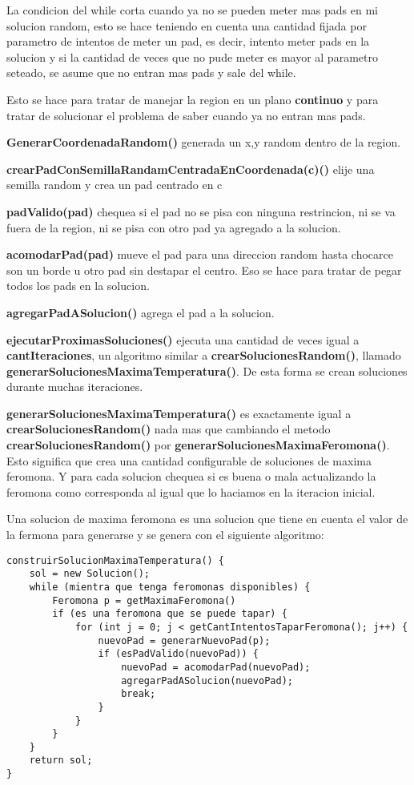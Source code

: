 La condicion del while corta cuando ya no se pueden meter mas pads en mi solucion random, esto se hace teniendo en cuenta una cantidad fijada por parametro de intentos de meter un pad, es decir, intento meter pads en la solucion y si la cantidad de veces que no pude meter es mayor al parametro seteado, se asume que no entran mas pads y sale del while. 

Esto se hace para tratar de manejar la region en un plano \textbf{continuo} y para tratar de solucionar el problema de saber cuando ya no entran mas pads.

\textbf{GenerarCoordenadaRandom()} generada un x,y random dentro de la region. 

\textbf{crearPadConSemillaRandamCentradaEnCoordenada(c)()} elije una semilla random y crea un pad centrado en c

\textbf{padValido(pad)} chequea si el pad no se pisa con ninguna restrincion, ni se va fuera de la region, ni se pisa con otro pad ya agregado a la solucion.

\textbf{acomodarPad(pad)} mueve el pad para una direccion random hasta chocarce son un borde u otro pad sin destapar el centro. Eso se hace para tratar de pegar todos los pads en la solucion.

\textbf{agregarPadASolucion()} agrega el pad a la solucion.

\textbf{ejecutarProximasSoluciones()} ejecuta una cantidad de veces igual a \textbf{cantIteraciones}, un algoritmo similar a \textbf{crearSolucionesRandom()}, llamado \textbf{generarSolucionesMaximaTemperatura()}. De esta forma se crean soluciones durante muchas iteraciones.

\textbf{generarSolucionesMaximaTemperatura()} es exactamente igual a \textbf{crearSolucionesRandom()} nada mas que cambiando el metodo \textbf{crearSolucionesRandom()} por \textbf{generarSolucionesMaximaFeromona()}. Esto significa que crea una cantidad configurable de soluciones de maxima feromona. Y para cada solucion chequea si es buena o mala actualizando la feromona como corresponda al igual que lo haciamos en la iteracion inicial.

Una solucion de maxima feromona es una solucion que tiene en cuenta el valor de la fermona para generarse y se genera con el siguiente algoritmo:


\begin{verbatim}
construirSolucionMaximaTemperatura() {
    sol = new Solucion();
    while (mientra que tenga feromonas disponibles) {
        Feromona p = getMaximaFeromona()
        if (es una feromona que se puede tapar) {
            for (int j = 0; j < getCantIntentosTaparFeromona(); j++) {
                nuevoPad = generarNuevoPad(p);
                if (esPadValido(nuevoPad)) {
                    nuevoPad = acomodarPad(nuevoPad);
                    agregarPadASolucion(nuevoPad);
                    break;
                }
            }
        }
    }
    return sol;
}
\end{verbatim}

